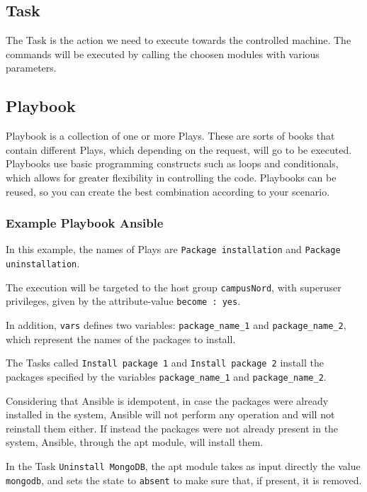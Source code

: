 \documentclass[12pt,a4paper,openright,twoside]{book}
\begin{document}
\subsection{Task}
The Task is the action we need to execute towards the controlled machine. The commands will be executed by calling the choosen modules with various parameters.

\subsection{Playbook}
Playbook is a collection of one or more Plays.
These are sorts of books that contain different Plays, which depending on the request, will go to be executed. Playbooks use basic programming constructs such as loops and conditionals, which allows for greater flexibility in controlling the code.
Playbooks can be reused, so you can create the best combination according to your scenario.

\subsubsection{Example Playbook Ansible}



In this example, the names of Plays are \texttt{Package installation} and \texttt{Package uninstallation}.

The execution will be targeted to the host group \texttt{campusNord}, with superuser privileges, given by the attribute-value \texttt{become : yes}.

In addition, \texttt{vars} defines two variables: \texttt{package\_name\_1} and \texttt{package\_name\_2}, which represent the names of the packages to install.

The Tasks called \texttt{Install package 1} and \texttt{Install package 2} install the packages specified by the variables \texttt{package\_name\_1} and \texttt{package\_name\_2}.

Considering that Ansible is idempotent,
in case the packages were already installed in the system, Ansible will not perform any operation and will not reinstall them either. If instead the packages were not already present in the system, Ansible, through the apt module, will install them.

In the Task \texttt{Uninstall MongoDB}, the apt module takes as input directly the value \texttt{mongodb}, and sets the state to \texttt{absent} to make sure that, if present, it is removed.
\end{document}
